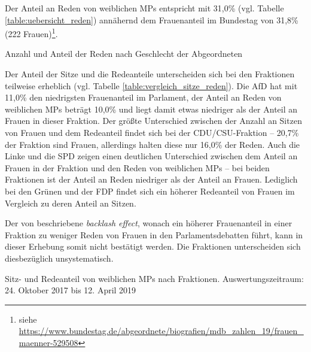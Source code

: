 \documentclass[12pt, 
    twoside=false, 
    bibliography=totoc, 
    numbers=endperiod, 
    headings=normal, 
    toc=chapterentrydotfill
    ]{scrbook}
\begin{document}
Der Anteil an Reden von weiblichen MPs entspricht mit 31,0\% (vgl. Tabelle \ref{table:uebersicht_reden}) annähernd dem Frauenanteil im Bundestag von 31,8\% (222 Frauen)\footnote{siehe \url{https://www.bundestag.de/abgeordnete/biografien/mdb_zahlen_19/frauen_maenner-529508}}.


\begin{table}[htb]
    \centering
    \caption{Anzahl und Anteil der Reden nach Geschlecht der Abgeordneten}
    
    \label{table:uebersicht_reden}
\end{table}

Der Anteil der Sitze und die Redeanteile unterscheiden sich bei den Fraktionen teilweise erheblich (vgl. Tabelle \ref{table:vergleich_sitze_reden}). Die AfD hat mit 11,0\% den niedrigsten Frauenanteil im Parlament, der Anteil an Reden von weiblichen MPs beträgt 10,0\% und liegt damit etwas niedriger als der Anteil an Frauen in dieser Fraktion. 
Der größte Unterschied zwischen der Anzahl an Sitzen von Frauen und dem Redeanteil findet sich bei der CDU/CSU-Fraktion -- 20,7\% der Fraktion sind Frauen, allerdings halten diese nur 16,0\% der Reden. Auch die Linke und die SPD zeigen einen deutlichen Unterschied zwischen dem Anteil an Frauen in der Fraktion und den Reden von weiblichen MPs -- bei beiden Fraktionen ist der Anteil an Reden niedriger als der Anteil an Frauen. Lediglich bei den Grünen und der FDP findet sich ein höherer Redeanteil von Frauen im Vergleich zu deren Anteil an Sitzen.

Der von \textcite{back_2018} beschriebene \emph{backlash effect}, wonach ein höherer Frauenanteil in einer Fraktion zu weniger Reden von Frauen in den Parlamentsdebatten führt, kann in dieser Erhebung somit nicht bestätigt werden. Die Fraktionen unterscheiden sich diesbezüglich unsystematisch.

\begin{table}[htb]
    \centering
    \caption[Sitz- und Redeanteil von weiblichen MPs nach Fraktionen]{Sitz- und Redeanteil von weiblichen MPs nach Fraktionen. Auswertungszeitraum: 24. Oktober 2017 bis 12. April 2019}
    
    \label{table:vergleich_sitze_reden}
\end{table}
\end{document}
